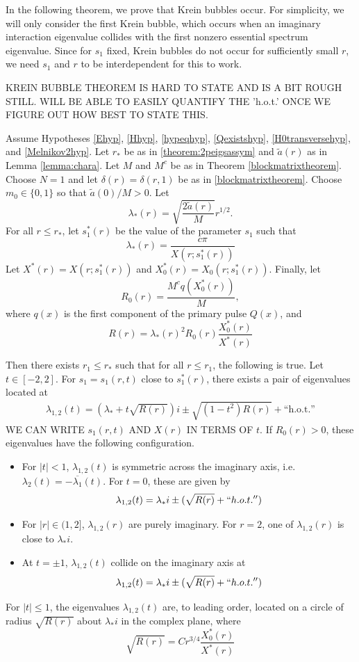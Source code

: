 \documentclass[thesis.tex]{subfiles}
\begin{document}
In the following theorem, we prove that Krein bubbles occur. For simplicity, we will only consider the first Krein bubble, which occurs when an imaginary interaction eigenvalue collides with the first nonzero essential spectrum eigenvalue. Since for $s_1$ fixed, Krein bubbles do not occur for sufficiently small $r$, we need $s_1$ and $r$ to be interdependent for this to work. 

KREIN BUBBLE THEOREM IS HARD TO STATE AND IS A BIT ROUGH STILL. WILL BE ABLE TO EASILY QUANTIFY THE 'h.o.t.' ONCE WE FIGURE OUT HOW BEST TO STATE THIS.

\begin{theorem}\label{theorem:kreinbubbles}
Assume Hypotheses \ref{Ehyp}, \ref{Hhyp}, \ref{hypeqhyp}, \ref{Qexistshyp}, \ref{H0transversehyp}, and \ref{Melnikov2hyp}. Let $r_*$ be as in \cref{theorem:2peigsassym} and $\tilde{a}(r)$ as in Lemma \ref{lemma:chara}. Let $M$ and $M^c$ be as in Theorem \ref{blockmatrixtheorem}. Choose $N = 1$ and let $\delta(r) = \delta(r,1)$ be as in \cref{blockmatrixtheorem}. Choose $m_0 \in \{0, 1\}$ so that $\tilde{a}(0)/M > 0$. Let
\[
\lambda_*(r) = \sqrt{\frac{ 2 \tilde{a}(r) }{M}} r^{1/2}.
\]
For all $r \leq r_*$, let $s_1^*(r)$ be the value of the parameter $s_1$ such that
\[
\lambda_*(r) = \frac{c \pi}{X(r; s_1^*(r))}
\] 
Let $X^*(r) = X(r; s_1^*(r))$ and $X_0^*(r) = X_0(r; s_1^*(r))$. Finally, let 
\[
R_0(r) = \frac{M^c q(X_0^*(r))}{M},
\]
where $q(x)$ is the first component of the primary pulse $Q(x)$, and
\[
R(r) = \lambda_*(r)^2 R_0(r) \frac{X_0^*(r)}{X^*(r)}
\]

Then there exists $r_1 \leq r_*$ such that for all $r \leq r_1$, the following is true. Let $t \in [-2, 2]$. For $s_1 = s_1(r, t)$ close to $s_1^*(r)$, there exists a pair of eigenvalues located at
\begin{align*}
\lambda_{1,2}(t) = \left( \lambda_* + t \sqrt{R(r)} \right) i \pm \sqrt{(1 - t^2)R(r)} + \text{``h.o.t.''}
\end{align*}
WE CAN WRITE $s_1(r, t)$ AND $X(r)$ IN TERMS OF $t$. If $R_0(r) > 0$, these eigenvalues have the following configuration.
\begin{itemize}
\item For $|t| < 1$, $\lambda_{1,2}(t)$ is symmetric across the imaginary axis, i.e. $\lambda_2(t) = -\overline{\lambda_1}(t)$. For $t = 0$, these are given by
\[
\lambda_{1,2}(t) = \lambda_* i \pm (\sqrt{R(r)} + ``h.o.t.'')
\]
\item For $|r| \in (1, 2]$, $\lambda_{1,2}(r)$
are purely imaginary. For $r = 2$, one of $\lambda_{1,2}(r)$ is close to $\lambda_* i$.

\item At $t = \pm 1$, $\lambda_{1,2}(t)$ collide on the imaginary axis at 
\[
\lambda_{1,2}(t) = \lambda_* i \pm (\sqrt{R(r)} + ``h.o.t.'')
\]
\end{itemize}
For $|t| \leq 1$, the eigenvalues $\lambda_{1,2}(t)$ are, to leading order, located on a circle of radius $\sqrt{R(r)}$ about $\lambda_* i$ in the complex plane, where
\[
\sqrt{R(r)} = C r^{3/4}\frac{X_0^*(r)}{X^*(r)}
\]
\end{theorem}
\end{document}
